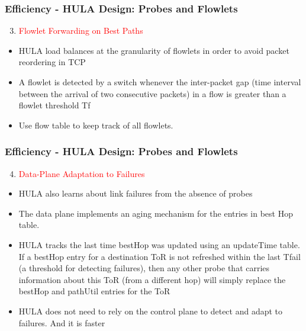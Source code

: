 \documentclass{beamer}
\begin{document}
\begin{frame}
	\frametitle{Efficiency - HULA Design: Probes and Flowlets}
	\begin{enumerate}
		\setcounter{enumi}{2}
		\item\textcolor{red}{Flowlet Forwarding on Best Paths}\\
	\end{enumerate}
	\begin{itemize}
		\item HULA load balances at the granularity of flowlets in order to avoid packet reordering in TCP
		\item  A flowlet is detected by a switch whenever the inter-packet gap (time interval between the arrival of two consecutive packets) in a flow is greater than a flowlet threshold Tf
		\item  Use flow table to keep track of all flowlets. 
	\end{itemize}
\end{frame}


\begin{frame}
	\frametitle{Efficiency - HULA Design: Probes and Flowlets}
	\begin{enumerate}
		\setcounter{enumi}{3}
		\item\textcolor{red}{Data-Plane Adaptation to Failures}\\
	\end{enumerate}
	\begin{itemize}
		\item HULA also learns about link failures from the absence of probes
		\item The data plane implements an aging mechanism for the entries in best Hop table.
		\item  HULA tracks the last time bestHop was updated using an updateTime table. If a bestHop entry for a destination ToR is not refreshed within the last Tfail (a threshold for detecting failures), then any other probe that carries information about this ToR (from a different hop) will simply replace the bestHop and pathUtil entries for the ToR 
		\item  HULA does not need to rely on the control plane to detect and adapt to failures. And it is faster
	\end{itemize}
\end{frame}

\end{document}
